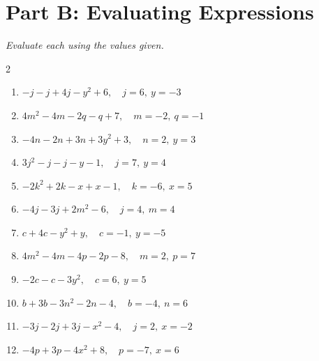 \documentclass[11pt]{article}
\begin{document}
\section*{Part B: Evaluating Expressions}
\noindent\textit{Evaluate each using the values given.}
\begin{multicols}{2}
\begin{enumerate}
  \item $- j - j + 4 j - y^{2} + 6, \quad j = 6,\ y = -3$
  \vspace{1.3cm}
  \item $4 m^{2} - 4 m - 2 q - q + 7, \quad m = -2,\ q = -1$
  \vspace{1.3cm}
  \item $- 4 n - 2 n + 3 n + 3 y^{2} + 3, \quad n = 2,\ y = 3$
  \vspace{1.3cm}
  \item $3 j^{2} - j - j - y - 1, \quad j = 7,\ y = 4$
  \vspace{1.3cm}
  \item $- 2 k^{2} + 2 k - x + x - 1, \quad k = -6,\ x = 5$
  \vspace{1.3cm}
  \item $- 4 j - 3 j + 2 m^{2} - 6, \quad j = 4,\ m = 4$
  \vspace{1.3cm}
  \item $c + 4 c - y^{2} + y, \quad c = -1,\ y = -5$
  \vspace{1.3cm}
  \item $4 m^{2} - 4 m - 4 p - 2 p - 8, \quad m = 2,\ p = 7$
  \vspace{1.3cm}
  \item $- 2 c - c - 3 y^{2}, \quad c = 6,\ y = 5$
  \vspace{1.3cm}
  \item $b + 3 b - 3 n^{2} - 2 n - 4, \quad b = -4,\ n = 6$
  \vspace{1.3cm}
  \item $- 3 j - 2 j + 3 j - x^{2} - 4, \quad j = 2,\ x = -2$
  \vspace{1.3cm}
  \item $- 4 p + 3 p - 4 x^{2} + 8, \quad p = -7,\ x = 6$
  \vspace{1.3cm}
\end{enumerate}
\end{multicols}
\end{document}
